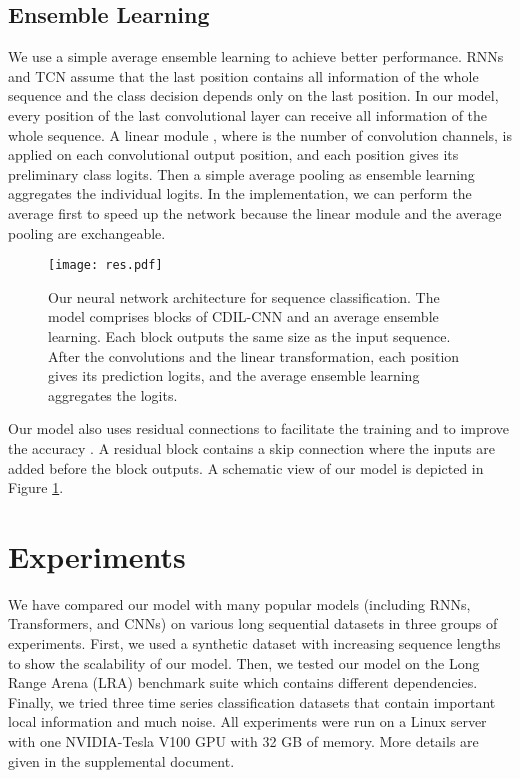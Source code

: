 \documentclass{article}
\begin{document}
\subsection{Ensemble Learning}
\label{subsec:ensem}

We use a simple average ensemble learning to achieve better performance. RNNs and TCN assume that the last position contains all information of the whole sequence and the class decision depends only on the last position. In our model, every position of the last convolutional layer can receive all information of the whole sequence. A linear module , where  is the number of convolution channels, is applied on each convolutional output position, and each position gives its preliminary class logits. Then a simple average pooling as ensemble learning aggregates the individual logits. In the implementation, we can perform the average first to speed up the network because the linear module and the average pooling are exchangeable.

\begin{figure}[tb]
	\centering
	\texttt{[image: res.pdf]}
	\caption{Our neural network architecture for sequence classification. The model comprises  blocks of CDIL-CNN and an average ensemble learning. Each block outputs the same size as the input sequence. After the convolutions and the linear transformation, each position gives its prediction logits, and the average ensemble learning aggregates the logits.}
	\label{fig:res}
\end{figure}

Our model also uses residual connections to facilitate the training and to improve the accuracy \cite{he2016deep, he2016identity}. A residual block contains a skip connection where the inputs are added before the block outputs. A schematic view of our model is depicted in Figure \ref{fig:res}.


\section{Experiments}
\label{sec:experiments}

We have compared our model with many popular models (including RNNs, Transformers, and CNNs) on various long sequential datasets in three groups of experiments. First, we used a synthetic dataset with increasing sequence lengths to show the scalability of our model. Then, we tested our model on the Long Range Arena (LRA) benchmark suite which contains different dependencies. Finally, we tried three time series classification datasets that contain important local information and much noise. All experiments were run on a Linux server with one NVIDIA-Tesla V100 GPU with 32 GB of memory. More details are given in the supplemental document.
\end{document}
